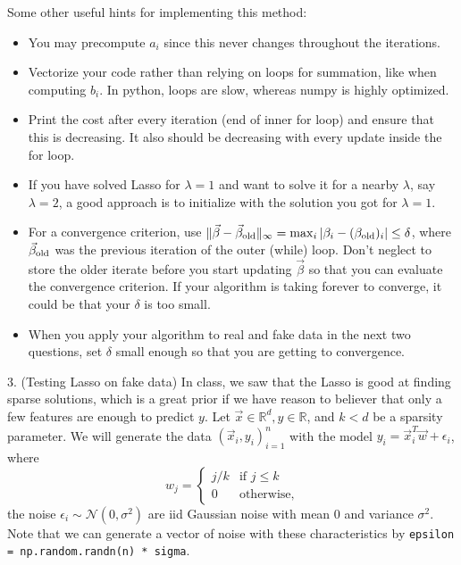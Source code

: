 \documentclass{article}
\newcommand{\R}{\mathbb{R}} %
\begin{document}
Some other useful hints for implementing this method:
\begin{itemize}
\item You may precompute $a_i$ since this never changes throughout the iterations.
\item Vectorize your code rather than relying on loops for summation,
  like when computing $b_i$. 
  In python, loops are slow, whereas numpy is highly optimized. 
\item Print the cost after every iteration (end of inner for loop)
    and ensure that this is decreasing.
    It also should be decreasing with every update inside the for loop.
\item If you have solved Lasso for $\lambda = 1$ and want to solve it for 
  a nearby $\lambda$, say $\lambda = 2$, a good approach is to initialize
  with the solution you got for $\lambda = 1$.
\item For a convergence criterion, use 
  $\| \vec \beta - \vec\beta_{\rm old} \|_\infty = \max_{i} |\beta_i - (\beta_{\rm old})_i| \leq \delta$,
  where $\vec \beta_{\rm old}$ was the previous iteration of the outer (while) loop.
  Don't neglect to store the older iterate before you start updating $\vec \beta$
  so that you can evaluate the convergence criterion. 
  If your algorithm is taking forever to converge, 
  it could be that your $\delta$ is too small.
\item When you apply your algorithm to real and fake data in the next two questions,
  set $\delta$ small enough so that you are getting to convergence.
\end{itemize}

3. (Testing Lasso on fake data)
In class, we saw that the Lasso is good at finding sparse solutions,
which is a great prior if we have reason to believer that only a few
features are enough to predict $y$.
Let $\vec x \in \R^d, y \in \R$, and $k < d$ be a sparsity parameter.
We will generate the data $(\vec x_i, y_i)_{i=1}^n$ 
with the model $y_i = \vec x_i^T \vec w + \epsilon_i$, where
\begin{equation*}
w_j =
\begin{cases}
  j/k & \mbox{if } j \leq k \\
  0 & \mbox{otherwise},
\end{cases}  
\end{equation*}
the noise $\epsilon_i \sim \mathcal{N}(0, \sigma^2)$ are iid Gaussian noise
with mean 0 and variance $\sigma^2$. 
Note that we can generate a vector of noise with these characteristics by
{\tt epsilon = np.random.randn(n) * sigma}.
\end{document}
